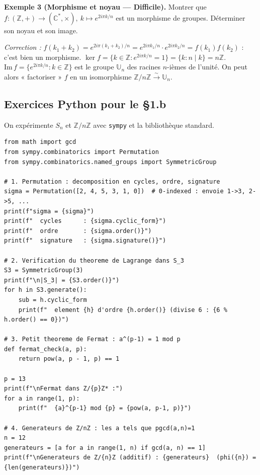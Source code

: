 \medskip

\textbf{Exemple 3 (Morphisme et noyau --- Difficile).}
Montrer que $f : (\mathbb{Z}, +) \to (\mathbb{C}^*, \times),\ k \mapsto e^{2i\pi k/n}$ est un morphisme de groupes. Déterminer son noyau et son image.

\textit{Correction :} $f(k_1 + k_2) = e^{2i\pi(k_1 + k_2)/n} = e^{2i\pi k_1/n} \cdot e^{2i\pi k_2/n} = f(k_1) f(k_2)$ : c'est bien un morphisme.
$\ker f = \{k \in \mathbb{Z} : e^{2i\pi k/n} = 1\} = \{k : n \mid k\} = n\mathbb{Z}$.
$\mathrm{Im}\, f = \{e^{2i\pi k/n} : k \in \mathbb{Z}\}$ est le groupe $\mathbb{U}_n$ des racines $n$-ièmes de l'unité.
On peut alors « factoriser » $f$ en un isomorphisme $\mathbb{Z}/n\mathbb{Z} \xrightarrow{\sim} \mathbb{U}_n$.

\subsection{Exercices Python pour le §1.b}
On expérimente $S_n$ et $\mathbb{Z}/n\mathbb{Z}$ avec \texttt{sympy} et la bibliothèque standard.

\begin{lstlisting}
from math import gcd
from sympy.combinatorics import Permutation
from sympy.combinatorics.named_groups import SymmetricGroup

# 1. Permutation : decomposition en cycles, ordre, signature
sigma = Permutation([2, 4, 5, 3, 1, 0])  # 0-indexed : envoie 1->3, 2->5, ...
print(f"sigma = {sigma}")
print(f"  cycles      : {sigma.cyclic_form}")
print(f"  ordre       : {sigma.order()}")
print(f"  signature   : {sigma.signature()}")

# 2. Verification du theoreme de Lagrange dans S_3
S3 = SymmetricGroup(3)
print(f"\n|S_3| = {S3.order()}")
for h in S3.generate():
    sub = h.cyclic_form
    print(f"  element {h} d'ordre {h.order()} (divise 6 : {6 % h.order() == 0})")

# 3. Petit theoreme de Fermat : a^(p-1) = 1 mod p
def fermat_check(a, p):
    return pow(a, p - 1, p) == 1

p = 13
print(f"\nFermat dans Z/{p}Z* :")
for a in range(1, p):
    print(f"  {a}^{p-1} mod {p} = {pow(a, p-1, p)}")

# 4. Generateurs de Z/nZ : les a tels que pgcd(a,n)=1
n = 12
generateurs = [a for a in range(1, n) if gcd(a, n) == 1]
print(f"\nGenerateurs de Z/{n}Z (additif) : {generateurs}  (phi({n}) = {len(generateurs)})")
\end{lstlisting}


